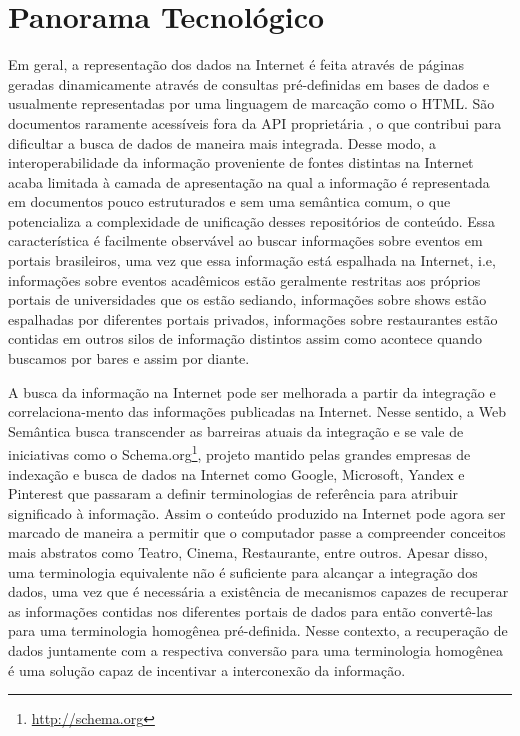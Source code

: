 \section{Panorama Tecnológico}
\label{sec:tecnologias}

Em geral, a representação dos dados na Internet é feita através de páginas geradas dinamicamente através de consultas pré-definidas em bases de dados e usualmente representadas por uma linguagem de marcação como o HTML. São documentos raramente acessíveis fora da API proprietária \citep{Mika2015}, o que contribui para dificultar a busca de dados de maneira mais integrada. Desse modo, a interoperabilidade da informação proveniente de fontes distintas na Internet acaba limitada à camada de apresentação na qual a informação é representada em documentos pouco estruturados e sem uma semântica comum, o que potencializa a complexidade de unificação desses repositórios de conteúdo. Essa característica é facilmente observável ao buscar informações sobre eventos em portais brasileiros, uma vez que essa informação está espalhada na Internet, i.e, informações sobre eventos acadêmicos estão geralmente restritas aos próprios portais de universidades que os estão sediando, informações sobre shows estão espalhadas por diferentes portais privados, informações sobre restaurantes estão contidas em outros silos de informação distintos assim como acontece quando buscamos por bares e assim por diante.

A busca da informação na Internet pode ser melhorada a partir da integração e correlaciona-mento das informações publicadas na Internet. Nesse sentido, a Web Semântica busca transcender as barreiras atuais da integração e se vale de iniciativas como o Schema.org\footnote{\url{http://schema.org}}, projeto mantido pelas grandes empresas de indexação e busca de dados na Internet como Google, Microsoft, Yandex e Pinterest que passaram a definir terminologias de referência para atribuir significado à informação. Assim o conteúdo produzido na Internet pode agora ser marcado de maneira a permitir que o computador passe a compreender conceitos mais abstratos como Teatro, Cinema, Restaurante, entre outros. Apesar disso, uma terminologia equivalente não é suficiente para alcançar a integração dos dados, uma vez que é necessária a existência de mecanismos capazes de recuperar as informações contidas nos diferentes portais de dados para então convertê-las para uma terminologia homogênea pré-definida. Nesse contexto, a recuperação de dados juntamente com a respectiva conversão para uma terminologia homogênea é uma solução capaz de incentivar a interconexão da informação. 

